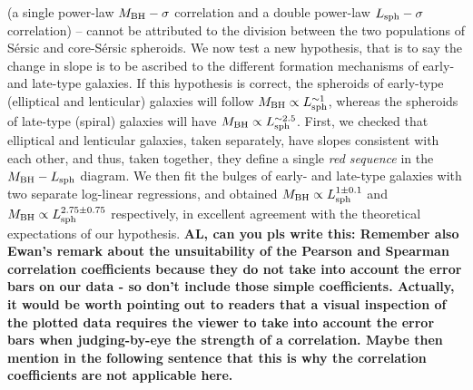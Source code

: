 \documentclass[preprint2]{emulateapj}
\begin{document}
(a single power-law $M_{\rm BH} - \sigma$ correlation and a double power-law $L_{\rm sph} - \sigma$ correlation) -- 
cannot be attributed to the division between the two populations of S\'ersic and core-S\'ersic spheroids.
We now test a new hypothesis, that is to say the change in slope is to be ascribed to the different formation mechanisms of early- and late-type galaxies. 
If this hypothesis is correct, 
the spheroids of early-type (elliptical and lenticular) galaxies will follow $M_{\rm BH} \propto L_{\rm sph}^{\sim 1}$, 
whereas the spheroids of late-type (spiral) galaxies will have $M_{\rm BH} \propto L_{\rm sph}^{\sim 2.5}$.
First, we checked that elliptical and lenticular galaxies, taken separately, have slopes consistent with each other, 
and thus, taken together, they define a single \emph{red sequence} in the $M_{\rm BH} - L_{\rm sph}$ diagram. 
We then fit the bulges of early- and late-type galaxies with two separate log-linear regressions, 
and obtained $M_{\rm BH} \propto L_{\rm sph}^{1 \pm 0.1}$ and $M_{\rm BH} \propto L_{\rm sph}^{2.75 \pm 0.75}$ respectively, 
in excellent agreement with the theoretical expectations of our hypothesis.
{\bf AL, can you pls write this: 
Remember also Ewan's remark about the unsuitability of the Pearson and Spearman correlation coefficients because 
they do not take into account the error bars on our data - 
so don't include those simple coefficients.  
Actually, it would be worth pointing out to readers that a visual inspection of the plotted data requires 
the viewer to take into account the error bars when judging-by-eye the strength of a correlation. 
Maybe then mention in the following sentence that this is why the correlation coefficients are not applicable here. }
\end{document}
